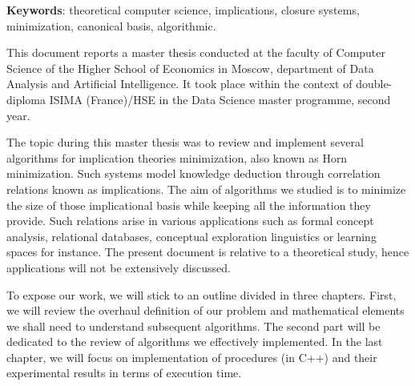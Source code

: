 \documentclass[a4paper, 10pt]{report}
\begin{document}
\textbf{Keywords}: theoretical computer science, implications, closure systems, minimization, canonical basis, algorithmic.

\tableofcontents



This document reports a master thesis conducted at the faculty of Computer Science of the Higher School of Economics in Moscow, department of Data Analysis and Artificial Intelligence. It took place within the context of double-diploma ISIMA (France)/HSE in the Data Science master programme, second year.

\vspace{1.2em}

The topic during this master thesis was to review and implement several algorithms for implication theories minimization, also known as Horn minimization. Such systems model knowledge deduction through correlation relations known as implications. The aim of algorithms we studied is to minimize the size of those implicational basis while
keeping all the information they provide. Such relations arise in various applications such as formal concept analysis, relational databases, conceptual exploration linguistics or learning spaces for instance. The present
document is relative to a theoretical study, hence applications will not be extensively discussed.

\vspace{1.2em}

To expose our work, we will stick to an outline divided in three chapters. First, we will review the overhaul definition of our problem and mathematical elements we shall need to understand subsequent algorithms. The second part will be dedicated to the review of algorithms we effectively implemented. In
the last chapter, we will focus on implementation of procedures (in C++) and their experimental results in terms of execution time.











\end{document}
